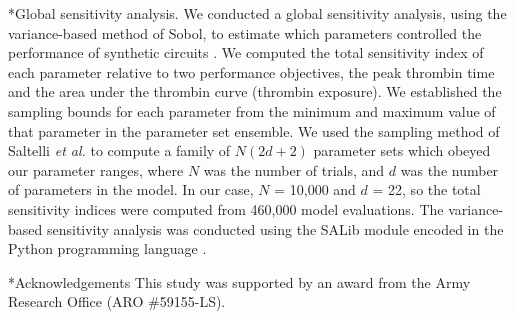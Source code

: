 \documentclass[12pt]{article}
\makeatletter
\renewcommand\subsection{\@startsection
	{subsection}{2}{0mm}
	{-0.05in}
	{-0.5\baselineskip}
	{\normalfont\normalsize\bfseries}}
\renewcommand\section{\@startsection
	{subsection}{2}{0mm}
	{-0.2in}
	{0.05\baselineskip}
	{\normalfont\large\bfseries}}
\makeatother
\begin{document}
\subsection*{Global sensitivity analysis.}
We conducted a global sensitivity analysis, using the variance-based method of Sobol, to estimate which parameters controlled the performance of synthetic circuits \citep{SOBOL_METHOD}.
We computed the total sensitivity index of each parameter relative to two performance objectives, the peak thrombin time and the area under the thrombin curve (thrombin exposure).
We established the sampling bounds for each parameter from the minimum and maximum value of that parameter in the parameter set ensemble.
We used the sampling method of Saltelli \textit{et al.} \citep{Saltelli:2010} to compute a family of $N\left(2d+2\right)$ parameter sets which obeyed our parameter ranges,
where $N$ was the number of trials, and $d$ was the number of parameters in the model. In our case, $N$ = 10,000 and $d$ = 22, so the total sensitivity indices were computed from
460,000 model evaluations. The variance-based sensitivity analysis was conducted using the SALib module encoded in the Python programming language \citep{SALIB}.

\clearpage

\section*{Acknowledgements}
This study was supported by an award from the Army Research Office (ARO \#59155-LS).
\clearpage



\clearpage

\renewcommand\thefigure{S\arabic{figure}}
\renewcommand\thetable{T\arabic{table}}
\renewcommand\thepage{S-\arabic{page}}
\renewcommand\theequation{S\arabic{equation}}

\setcounter{equation}{0}
\setcounter{table}{0}
\setcounter{figure}{0}
\setcounter{page}{1}
\end{document}

